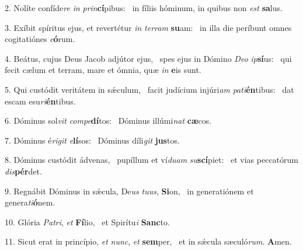 2. Nolíte confíde\textit{re} \textit{in} \textit{prin}\textbf{cí}pibus: \ast\  in fíliis hóminum, in quibus non \textit{est} \textbf{sa}lus.\

3. Exíbit spíritus ejus, et revertétur \textit{in} \textit{ter}\textit{ram} \textbf{su}am: \ast\  in illa die períbunt omnes cogitatiónes \textit{e}\textbf{ó}rum.\

4. Beátus, cujus Deus Jacob adjútor ejus, \dag\  spes ejus in Dómino \textit{De}\textit{o} \textit{ip}\textbf{sí}us: \ast\  qui fecit cælum et terram, mare et ómnia, quæ \textit{in} \textbf{e}is sunt.\

5. Qui custódit veritátem in sǽculum, \dag\  facit judícium injúri\textit{am} \textit{pa}\textit{ti}\textbf{én}tibus: \ast\  dat escam esu\textit{ri}\textbf{én}tibus.\

6. Dóminus sol\textit{vit} \textit{com}\textit{pe}\textbf{dí}tos: \ast\  Dóminus illúmi\textit{nat} \textbf{cæ}cos.\

7. Dóminus é\textit{ri}\textit{git} \textit{e}\textbf{lí}sos: \ast\  Dóminus díli\textit{git} \textbf{jus}tos.\

8. Dóminus custódit ádvenas, \dag\  pupíllum et ví\textit{du}\textit{am} \textit{su}\textbf{scí}piet: \ast\  et vias peccatórum \textit{dis}\textbf{pér}det.\

9. Regnábit Dóminus in sǽcula, De\textit{us} \textit{tu}\textit{us}, \textbf{Si}on, \ast\  in generatiónem et genera\textit{ti}\textbf{ó}nem.\

10. Glória \textit{Pa}\textit{tri}, \textit{et} \textbf{Fí}lio, \ast\  et Spirítu\textit{i} \textbf{Sanc}to.\

11. Sicut erat in princípio, \textit{et} \textit{nunc}, \textit{et} \textbf{sem}per, \ast\  et in sǽcula sæculó\textit{rum}. \textbf{A}men.\


